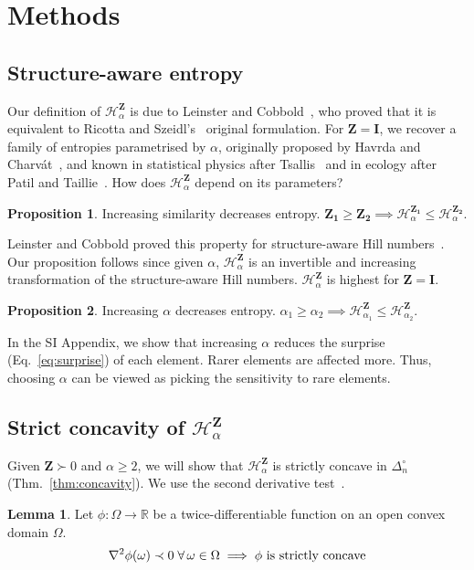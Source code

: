 \documentclass[aps,pre,floats,floatfix,superscriptaddress,twocolumn,final,10pt]{revtex4-2}
\theoremstyle{definition}
\newtheorem{proposition}{Proposition}
\newtheorem{lemma}{Lemma}
\renewcommand{\vec}[1]{\mathbf{#1}}
\newcommand{\entropyname}[2]{\mathcal{H}^{#1}_{#2}}
\begin{document}
\section{Methods}

\subsection{Structure-aware entropy}
Our definition of $\entropyname{\vec{Z}}{\alpha}$ is due to Leinster and Cobbold~\cite{Leinster2012}, who proved that it is equivalent to Ricotta and Szeidl's~\cite{Ricotta2006} original formulation. For $\vec{Z}=\vec{I}$, we recover a family of entropies parametrised by $\alpha$, originally proposed by Havrda and Charv\'at~\cite{Havrda1967}, and known in statistical physics after Tsallis~\cite{Tsallis1988} and in ecology after Patil and Taillie~\cite{Patil1982}.
How does $\entropyname{\vec{Z}}{\alpha}$ depend on its parameters?
\begin{proposition}
    Increasing similarity decreases entropy. $\vec{Z_1}\geq\vec{Z_2} \implies \entropyname{\vec{Z_1}}{\alpha} \leq \entropyname{\vec{Z_2}}{\alpha}.$
\end{proposition}
Leinster and Cobbold proved this property for structure-aware Hill numbers~\cite[Appendix Proposition A17]{Leinster2012}. Our proposition follows since given $\alpha$, $\entropyname{\vec{Z}}{\alpha}$ is an invertible and increasing transformation of the structure-aware Hill numbers. $\entropyname{\vec{Z}}{\alpha}$ is highest for $\vec{Z}=\vec{I}$.

\begin{proposition}
    Increasing $\alpha$ decreases entropy. $\alpha_1\geq\alpha_2 \implies \entropyname{\vec{Z}}{\alpha_1} \leq \entropyname{\vec{Z}}{\alpha_2}$.
\end{proposition}
In the SI Appendix, we show that increasing $\alpha$ reduces the surprise (Eq.~\ref{eq:surprise}) of each element. Rarer elements are affected more. Thus, choosing $\alpha$ can be viewed as picking the sensitivity to rare elements.


\subsection{Strict concavity of $\entropyname{\vec{Z}}{\alpha}$}

Given $\vec{Z}\succ0$ and $\alpha\geq2$, we will show that $\entropyname{\vec{Z}}{\alpha}$ is strictly concave in $\Delta_n^\circ$ (Thm.~\ref{thm:concavity}). We use the second derivative test~\cite[Section 3.1.4]{Boyd2004}.
\begin{lemma}
     Let $\phi:\Omega \to \mathbb{R}$ be a twice-differentiable function on an open convex domain $\Omega$.
    \begin{equation*}
        \nabla^2\phi(\omega) \prec 0 \; \forall \, \omega \in \Omega \implies \phi \textnormal{ is strictly concave}
    \end{equation*}
\end{lemma}
\end{document}
